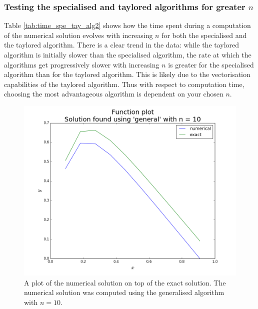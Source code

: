 \documentclass[reprint,english]{revtex4-1}
\begin{document}
\subsubsection{Testing the specialised and taylored algorithms for greater \(n\)}
Table \ref{tab:time_spe_tay_alg2} shows how the time spent during a computation of the numerical solution evolves with increasing \(n\) for both the specialised and the taylored algorithm. There is a clear trend in the data: while the taylored algorithm is initially slower than the specialised algorithm, the rate at which the algorithms get progressively slower with increasing \(n\) is greater for the specialised algorithm than for the taylored algorithm. This is likely due to the vectorisation capabilities of the taylored algorithm. Thus with respect to computation time, choosing the most advantageous algorithm is dependent on your chosen \(n\).

\begin{figure}[ht]
\centering
\includegraphics[scale=0.28]{figures/general_10_funcplot.png}
\caption{A plot of the numerical solution on top of the exact solution. The numerical solution was computed using the generalised algorithm with \(n=10\).}\label{fig:gen_alg_n10}
\end{figure}
\newpage
\end{document}
